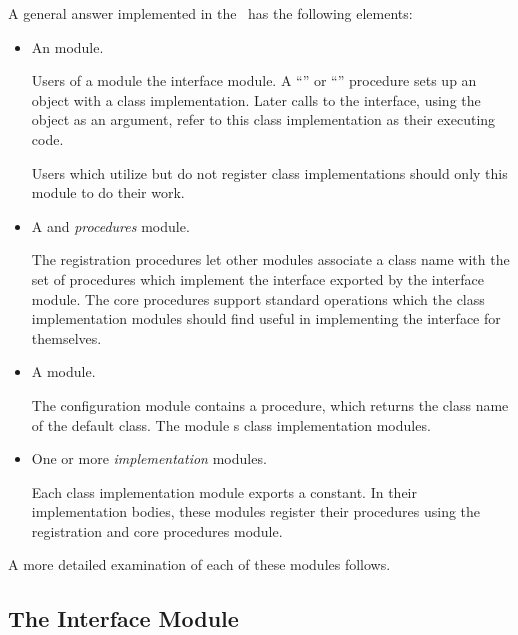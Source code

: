 A general answer implemented in the \library\ has the following elements:
\begin{itemize}
\item
 An  module.
 
 Users of a module  the interface module.  A ``'' or
 ``'' procedure sets up an object with a class implementation. Later
 calls to the interface, using the object as an argument, refer to this class
 implementation as their executing code.

 Users which utilize but do not register class implementations should
  only this module to do their work.

\item
 A  and  
 {\em procedures} module.

 The registration procedures let other modules associate a class name
 with the set of procedures which implement the interface exported by the
 interface module.  The core procedures support standard operations
 which the class implementation modules should find useful in implementing the
 interface for themselves.

\item
 A  module.

 The configuration module contains a 
 procedure, which returns the class name of the default class.  The
 module s class implementation modules.

\item
 One or more  {\em implementation}  modules.
 
 Each class implementation module exports a 
 constant.  In their implementation bodies, these modules register their
 procedures using the registration and core procedures module.
\end{itemize}

A more detailed examination of each of these modules follows.

\subsection{The Interface Module}

